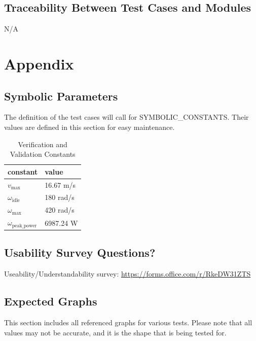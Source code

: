\documentclass[12pt, titlepage]{article}
\begin{document}
\subsection{Traceability Between Test Cases and Modules}
N/A	





\newpage

\section{Appendix}

\subsection{Symbolic Parameters}

The definition of the test cases will call for SYMBOLIC\_CONSTANTS.
Their values are defined in this section for easy maintenance.

\begin{table}[h]
  \raggedright
  \begin{tabular}{l l} 
    \toprule		
    \textbf{constant} & \textbf{value}\\
    \midrule
    $v_\text{max}$ & 16.67 m/s \\
    $\omega_{\text{idle}}$ & 180 rad/s \\
    $\omega_\text{max}$ & 420 rad/s \\
    $\omega_\text{peak\_power}$ & 6987.24 W \\
    \bottomrule
  \end{tabular}
  \caption{Verification and Validation Constants}
  \label{tab:vnv_constants}
\end{table}

\subsection{Usability Survey Questions?}

Useability/Understandability survey:
\url{https://forms.office.com/r/RkeDW31ZTS}

\subsection{Expected Graphs}
This section includes all referenced graphs for various tests. Please note that all values may not be accurate, and it is the shape that is being tested for.
\end{document}
